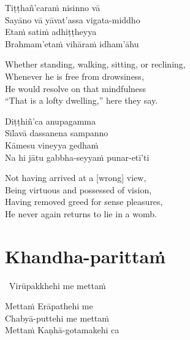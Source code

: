 \begin{pali-hang-continued}
  Tiṭṭhañ'caraṁ nisinno vā\\
  Sayāno vā yāvat'assa vigata-middho\\
  Etaṁ satiṁ adhiṭṭheyya\\
  Brahmam'etaṁ vihāraṁ idham'āhu
\end{pali-hang-continued}

\begin{english-verses}
  Whether standing, walking, sitting, or reclining,\\
  Whenever he is free from drowsiness,\\
  He would resolve on that mindfulness\\
  ``That is a lofty dwelling,'' here they say.
\end{english-verses}

\begin{pali-hang-continued}
  Diṭṭhiñ'ca anupagamma\\
  Sīlavā dassanena sampanno\\
  Kāmesu vineyya gedhaṁ\\
  Na hi jātu gabbha-seyyaṁ punar-etī'ti
\end{pali-hang-continued}

\begin{english-verses}
  Not having arrived at a [wrong] view,\\
  Being virtuous and possessed of vision,\\
  Having removed greed for sense pleasures,\\
  He never again returns to lie in a womb.
\end{english-verses}

\suttaRef{[Snp 1.8]}

\section{Khandha-parittaṁ}
\label{khandha-parittam}

\begin{pali-leader}
  \anglebracketleft\ \hspace{-0.5mm}Virūpakkhehi me mettaṁ \hspace{-0.5mm}\anglebracketright\
\end{pali-leader}
\begin{pali-hangtogether}
  Mettaṁ Erāpathehi me\\
  Chabyā-puttehi me mettaṁ\\
  Mettaṁ Kaṇhā-gotamakehi ca
\end{pali-hangtogether}


